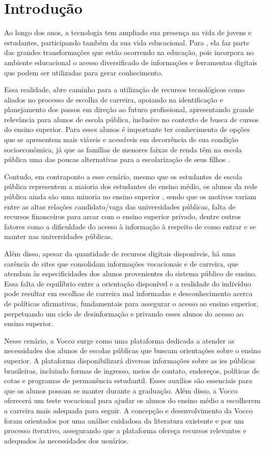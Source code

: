 \chapter{Introdução}
Ao longo dos anos, a tecnologia tem ampliado sua presença na vida de jovens e estudantes, participando também da sua vida educacional. Para \cite{alves2022tecnologia}, ela faz parte das grandes transformações que estão ocorrendo na educação, pois incorpora no ambiente educacional o acesso diversificado de informações e ferramentas digitais que podem ser utilizadas para gerar conhecimento. 

Essa realidade, abre caminho para a utilização de recursos tecnológicos como aliados no processo de escolha de carreira, apoiando na identificação e planejamento dos passos em direção ao futuro profissional, apresentando grande relevância para alunos de escola pública, inclusive no contexto de busca de cursos do ensino superior. Para esses alunos é importante ter conhecimento de opções que se apresentem mais viáveis e acessíveis em decorrência de sua condição socioeconômica, já que as famílias de menores faixas de renda têm na escola pública uma das poucas alternativas para a escolarização de seus filhos \cite{matos2012impacto}.

Contudo, em contraponto a esse cenário, mesmo que os estudantes de escola pública representem a maioria dos estudantes do ensino médio, os alunos da rede pública ainda são uma minoria no ensino superior \cite{alvarenga2012desafios}, sendo que os motivos variam entre as altas relações candidato/vaga das universidades públicas, falta de recursos financeiros para arcar com o ensino superior privado, dentre outros fatores como a dificuldade do acesso à informação à respeito de como entrar e se manter nas universidades públicas.

Além disso, apesar da quantidade de recursos digitais disponíveis, há uma carência de sites que consolidam informações vocacionais e de carreira, que atendam às especificidades dos alunos provenientes do sistema público de ensino. Essa falta de equilíbrio entre a orientação disponível e a realidade do indivíduo pode resultar em escolhas de carreira mal informadas e desconhecimento acerca de políticas afirmativas, fundamentais para assegurar o acesso ao ensino superior, perpetuando um ciclo de desinformação e  privando esses alunos do acesso ao ensino superior.

Nesse cenário, a Vocco surge como uma plataforma dedicada a atender as necessidades dos alunos de escolas públicas que buscam orientações sobre o ensino superior. A plataforma disponibilizará diversas informações sobre as \ac{ies}  públicas brasileiras, incluindo formas de ingresso, meios de contato, endereços, políticas de cotas e programas de permanência estudantil. Esses auxílios são essenciais para que os alunos possam se manter durante a graduação. Além disso, a Vocco oferecerá um teste vocacional para ajudar os alunos do ensino médio a escolherem a carreira mais adequada para seguir. A concepção e desenvolvimento da Vocco foram orientados por uma análise cuidadosa da literatura existente e por um processo iterativo, assegurando que a plataforma ofereça recursos relevantes e adequados às necessidades dos usuários.




% 
% 
% 

